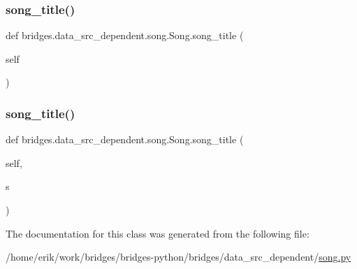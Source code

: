 \subsubsection{\texorpdfstring{song\+\_\+title()}{song\_title()}\hspace{0.1cm}{\footnotesize\ttfamily [1/2]}}
{\footnotesize\ttfamily def bridges.\+data\+\_\+src\+\_\+dependent.\+song.\+Song.\+song\+\_\+title (\begin{DoxyParamCaption}\item[{}]{self }\end{DoxyParamCaption})}

\mbox{\label{classbridges_1_1data__src__dependent_1_1song_1_1_song_aa1f51734629030528f5bc86a6b2478f1}} 
\subsubsection{\texorpdfstring{song\+\_\+title()}{song\_title()}\hspace{0.1cm}{\footnotesize\ttfamily [2/2]}}
{\footnotesize\ttfamily def bridges.\+data\+\_\+src\+\_\+dependent.\+song.\+Song.\+song\+\_\+title (\begin{DoxyParamCaption}\item[{}]{self,  }\item[{}]{s }\end{DoxyParamCaption})}



The documentation for this class was generated from the following file\+:\begin{DoxyCompactItemize}
\item 
/home/erik/work/bridges/bridges-\/python/bridges/data\+\_\+src\+\_\+dependent/\hyperlink{song_8py}{song.\+py}\end{DoxyCompactItemize}
